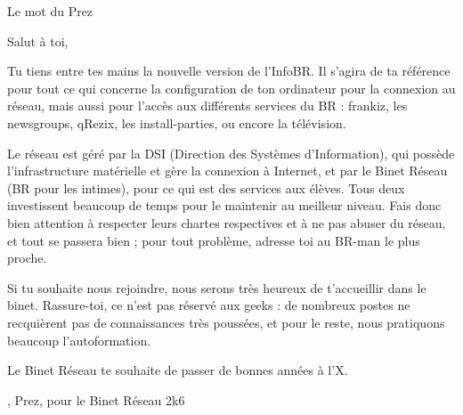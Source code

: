 

\begin{center}
    { \Huge Le mot du Prez }
\end{center}

Salut \`a toi,

Tu tiens entre tes mains la nouvelle version de l'InfoBR. Il s'agira de ta r\'ef\'erence pour tout ce qui concerne la configuration de ton ordinateur pour la connexion au r\'eseau, mais aussi pour l'acc\`es aux diff\'erents services du BR :
frankiz, les newsgroups, qRezix, les install-parties, ou encore la t\'el\'evision.

Le r\'eseau est g\'er\'e par la DSI (Direction des Syst\`emes d'Information), qui poss\`ede l'infrastructure mat\'erielle et g\`ere la connexion \`a Internet,
et par le Binet R\'eseau (BR pour les intimes), pour ce qui est des services aux \'el\`eves. Tous deux investissent beaucoup de temps pour le maintenir au meilleur niveau.
Fais donc bien attention \`a respecter leurs chartes respectives et \`a ne pas abuser du r\'eseau, et tout se passera bien ; pour tout probl\`eme, adresse toi au
BR-man le plus proche.

Si tu souhaite nous rejoindre, nous serons tr\`es heureux de t'accueillir dans le binet. Rassure-toi, ce n'est pas r\'eserv\'e aux geeks : de nombreux postes ne recqui\`erent pas de connaissances tr\`es pouss\'ees, et pour le reste, nous pratiquons beaucoup l'autoformation.

Le Binet R\'eseau te souhaite de passer de bonnes ann\'ees \`a l'X.

\begin{flushright}
    , Prez, pour le Binet R\'eseau 2k6
\end{flushright}

